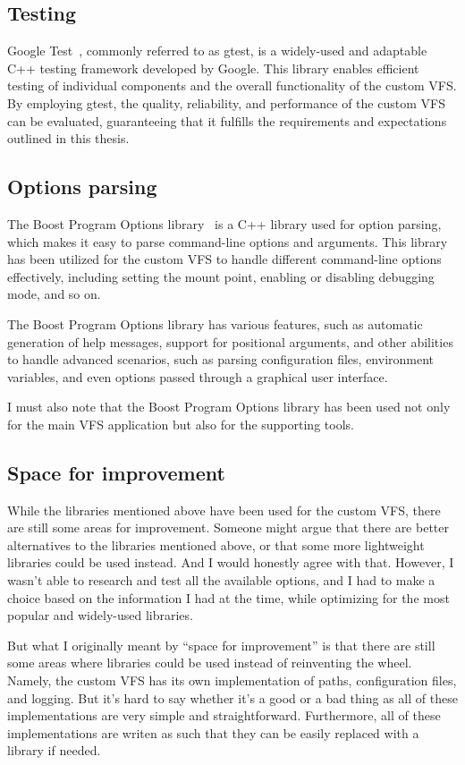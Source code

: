 \subsection{Testing}\label{subsec:gtest}

Google Test~\cite{google_test}, commonly referred to as gtest, is a widely-used and adaptable C++ testing framework developed by Google.
This library enables efficient testing of individual components and the overall functionality of the custom VFS\@.
By employing gtest, the quality, reliability, and performance of the custom VFS can be evaluated, guaranteeing that it fulfills the requirements and expectations outlined in this thesis.

\subsection{Options parsing}\label{subsec:options-parsing}

The Boost Program Options library~\cite{boost_program_options} is a C++ library used for option parsing, which makes it easy to parse command-line options and arguments.
This library has been utilized for the custom VFS to handle different command-line options effectively, including setting the mount point, enabling or disabling debugging mode, and so on.

The Boost Program Options library has various features, such as automatic generation of help messages, support for positional arguments, and other abilities to handle advanced scenarios, such as parsing configuration files, environment variables, and even options passed through a graphical user interface.

I must also note that the Boost Program Options library has been used not only for the main VFS application but also for the supporting tools.


\subsection{Space for improvement}\label{subsec:libs-space-for-improvement}

While the libraries mentioned above have been used for the custom VFS, there are still some areas for improvement.
Someone might argue that there are better alternatives to the libraries mentioned above, or that some more lightweight libraries could be used instead.
And I would honestly agree with that.
However, I wasn't able to research and test all the available options, and I had to make a choice based on the information I had at the time, while optimizing for the most popular and widely-used libraries.

But what I originally meant by ``space for improvement'' is that there are still some areas where libraries could be used instead of reinventing the wheel.
Namely, the custom VFS has its own implementation of paths, configuration files, and logging.
But it's hard to say whether it's a good or a bad thing as all of these implementations are very simple and straightforward.
Furthermore, all of these implementations are writen as such that they can be easily replaced with a library if needed.